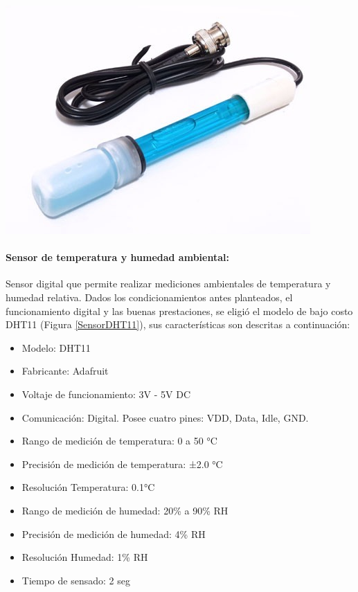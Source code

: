                 \begin{minipage}{0.95\textwidth}
                    \begin{center}
                    \includegraphics[scale=0.35]{hardware/electrododepH.jpg}
                    \label{phElectrode}
                    \end{center}
                \end{minipage}
                
            \paragraph{Sensor de temperatura y humedad ambiental:}Sensor digital que permite realizar mediciones ambientales de temperatura y humedad relativa. Dados los condicionamientos antes planteados, el funcionamiento digital y las buenas prestaciones, se eligió el modelo de bajo costo DHT11 (Figura \ref{SensorDHT11}), sus características son descritas a continuación:
                \begin{itemize}
                    \item Modelo: DHT11
                    \item Fabricante: Adafruit
                    \item Voltaje de funcionamiento: 3V - 5V DC
                    \item Comunicación: Digital. Posee cuatro pines: VDD, Data, Idle, GND.
                    \item Rango de medición de temperatura: 0 a 50 °C
                    \item Precisión de medición de temperatura: ±2.0 °C
                    \item Resolución Temperatura: 0.1°C
                    \item Rango de medición de humedad: 20\% a 90\% RH
                    \item Precisión de medición de humedad: 4\% RH
                    \item Resolución Humedad: 1\% RH
                    \item Tiempo de sensado: 2 seg
                \end{itemize}
                
